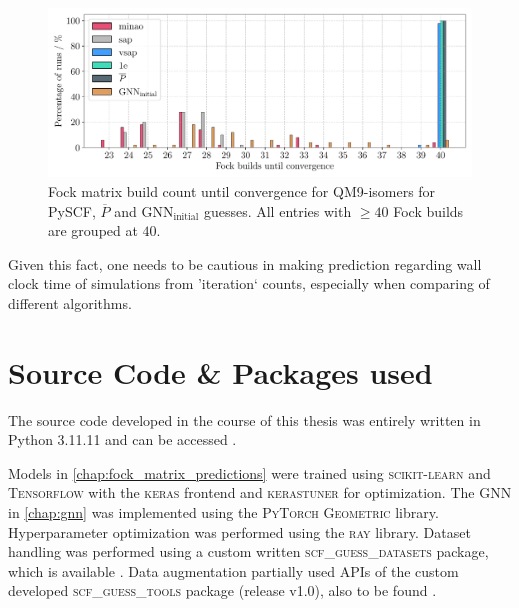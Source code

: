 \begin{figure}[H]
    \centering
    \includegraphics[width=\textwidth]{../fig/gnn/SO_0D_GNN_model_fock_build_count_bar.pdf}
    \caption[Fock matrix build count until convergence QM9-isomers]{Fock matrix build count until convergence for QM9-isomers for PySCF, $\overline{P}$ and GNN$_\text{initial}$ guesses. All entries with $\geq 40$ Fock builds are grouped at $40$.}
    \label{fig:so_fock_build_iterations}
\end{figure}
Given this fact, one needs to be cautious in making prediction regarding wall clock time of simulations from 'iteration` counts, especially when comparing of different algorithms.

\section{Source Code \& Packages used}
\label{sec:source_code_packages}
The source code developed in the course of this thesis was entirely written in Python 3.11.11 \parencite{ref:python} and can be accessed . \parencite{ref:molgraphnetwork}

Models in \autoref{chap:fock_matrix_predictions} were trained using \textsc{scikit-learn} \parencite{ref:sk-learn} and \textsc{Tensorflow} \parencite{ref:tensorflow} with the \textsc{keras} frontend \parencite{ref:keras} and \textsc{kerastuner} \parencite{ref:kerastuner} for optimization. The GNN in \autoref{chap:gnn} was implemented using the \textsc{PyTorch Geometric} library. \parencite{ref:PyTorchGeometric} Hyperparameter optimization was performed using the \textsc{ray} library. \parencite{ref:ray_tune} Dataset handling was performed using a custom written \textsc{scf\_guess\_datasets} package, which is available . \parencite{ref:milacher_scf_guess_datasets} Data augmentation partially used APIs of the custom developed \textsc{scf\_guess\_tools} package (release v1.0), also to be found . \parencite{ref:scf_guess_tools}